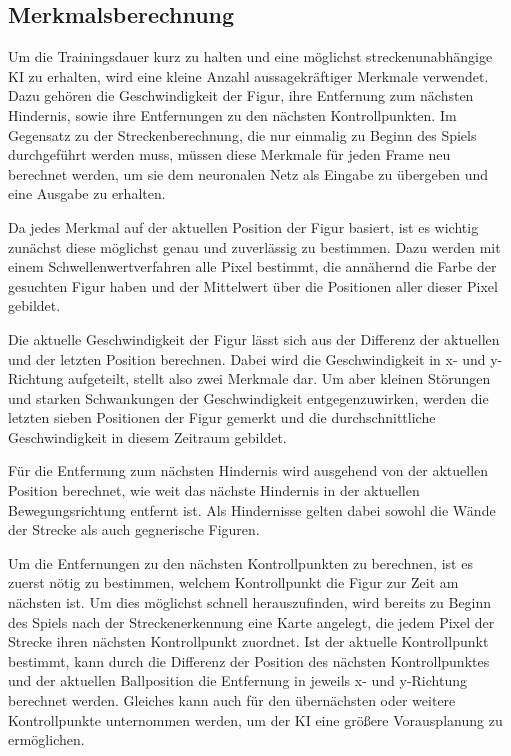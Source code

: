 \documentclass[11pt,final,journal,a4paper,towside,towcolumn]{IEEEtran}
\begin{document}
\subsection{Merkmalsberechnung}
Um die Trainingsdauer kurz zu halten und eine möglichst streckenunabhängige KI zu erhalten, wird eine kleine Anzahl aussagekräftiger Merkmale verwendet. Dazu gehören die Geschwindigkeit der Figur, ihre Entfernung zum nächsten Hindernis, sowie ihre Entfernungen zu den nächsten Kontrollpunkten. Im Gegensatz zu der Streckenberechnung, die nur einmalig zu Beginn des Spiels durchgeführt werden muss, müssen diese Merkmale für jeden Frame neu berechnet werden, um sie dem neuronalen Netz als Eingabe zu übergeben und eine Ausgabe zu erhalten.

Da jedes Merkmal auf der aktuellen Position der Figur basiert, ist es wichtig zunächst diese möglichst genau und zuverlässig zu bestimmen. Dazu werden mit einem Schwellenwertverfahren alle Pixel bestimmt, die annähernd die Farbe der gesuchten Figur haben und der Mittelwert über die Positionen aller dieser Pixel gebildet.

Die aktuelle Geschwindigkeit der Figur lässt sich aus der Differenz der aktuellen und der letzten Position berechnen. Dabei wird die Geschwindigkeit in x- und y-Richtung aufgeteilt, stellt also zwei Merkmale dar. Um aber kleinen Störungen und starken Schwankungen der Geschwindigkeit entgegenzuwirken, werden die letzten sieben Positionen der Figur gemerkt und die durchschnittliche Geschwindigkeit in diesem Zeitraum gebildet.

Für die Entfernung zum nächsten Hindernis wird ausgehend von der aktuellen Position berechnet, wie weit das nächste Hindernis in der aktuellen Bewegungsrichtung entfernt ist. Als Hindernisse gelten dabei sowohl die Wände der Strecke als auch gegnerische Figuren.

Um die Entfernungen zu den nächsten Kontrollpunkten zu berechnen, ist es zuerst nötig zu bestimmen, welchem Kontrollpunkt die Figur zur Zeit am nächsten ist. Um dies möglichst schnell herauszufinden, wird bereits zu Beginn des Spiels nach der Streckenerkennung eine Karte angelegt, die jedem Pixel der Strecke ihren nächsten Kontrollpunkt zuordnet. Ist der aktuelle Kontrollpunkt bestimmt, kann durch die Differenz der Position des nächsten Kontrollpunktes und der aktuellen Ballposition die Entfernung in jeweils x- und y-Richtung berechnet werden. Gleiches kann auch für den übernächsten oder weitere Kontrollpunkte unternommen werden, um der KI eine größere Vorausplanung zu ermöglichen.
\end{document}
